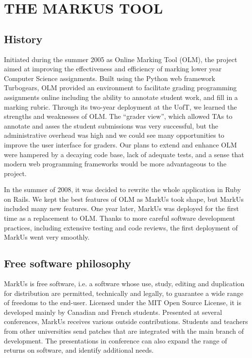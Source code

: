\documentclass[twocolumn,10pt]{asme2e}
\begin{document}
\section*{THE MARKUS TOOL}



\subsection*{History}

Initiated during the summer 2005 as Online Marking Tool (OLM), the project aimed
at improving the effectiveness and efficiency of marking lower year Computer
Science assignments. Built using the Python web framework Turbogears, OLM
provided an environment to facilitate grading programming assignments online including the ability to annotate student work, and fill in a marking rubric. Through its two-year deployment at the UofT, we learned the strengths and weaknesses of OLM. The ``grader view'', which allowed TAs to annotate and asses the student submissions was very successful, but the administrative overhead was high and we could see many opportunities to improve the user interface for graders. Our plans to extend and enhance OLM were hampered by a decaying code base, lack of adequate tests, and a sense that modern web programming frameworks would be more advantageous to the project.

In the summer of 2008, it was decided to rewrite the whole application in Ruby on Rails. We kept the best features of OLM as MarkUs took shape, but MarkUs included many new features. One year later, MarkUs was deployed for the first time as a replacement to OLM. Thanks to more careful software development practices, including extensive testing and code reviews, the first deployment of MarkUs went very smoothly.

\subsection*{Free software philosophy}
MarkUs is free software, i.e. a software whose use, study, editing and duplication for distribution are permitted, technically and legally, to guarantee a wide range of freedoms to the end-user. Licensed under the MIT Open Source License, it is developed mainly by Canadian and French students.
Presented at several conferences, MarkUs receives various outside contributions. Students and teachers from other universities send patches that are integrated with the main branch of development. The presentations in conference can also expand the range of returns on software, and identify additional needs.
\end{document}

